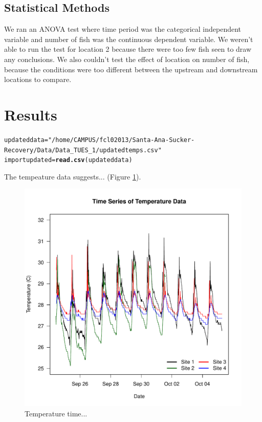 \documentclass{article}\usepackage[]{graphicx}\usepackage[]{color}
\makeatletter
\newcommand{\hlstr}[1]{\textcolor[rgb]{0.192,0.494,0.8}{#1}}%
\newcommand{\hlstd}[1]{\textcolor[rgb]{0.345,0.345,0.345}{#1}}%
\newcommand{\hlkwb}[1]{\textcolor[rgb]{0.69,0.353,0.396}{#1}}%
\newcommand{\hlkwd}[1]{\textcolor[rgb]{0.737,0.353,0.396}{\textbf{#1}}}%
\newenvironment{kframe}{%
 \def\at@end@of@kframe{}%
 \ifinner\ifhmode%
  \def\at@end@of@kframe{\end{minipage}}%
  \begin{minipage}{\columnwidth}%
 \fi\fi%
 \def\FrameCommand##1{\hskip\@totalleftmargin \hskip-\fboxsep
 \colorbox{shadecolor}{##1}\hskip-\fboxsep
     \hskip-\linewidth \hskip-\@totalleftmargin \hskip\columnwidth}%
 \MakeFramed {\advance\hsize-\width
   \@totalleftmargin\z@ \linewidth\hsize
   \@setminipage}}%
 {\par\unskip\endMakeFramed%
 \at@end@of@kframe}
\newenvironment{knitrout}{}{} %
\makeatother
\begin{document}
\subsection{Statistical Methods}

We ran an ANOVA test where time period was the categorical independent variable and number of fish was the continuous dependent variable.  We weren’t able to run the test for location 2 because there were too few fish seen to draw any conclusions.  We also couldn’t test the effect of location on number of fish, because the conditions were too different between the upstream and downstream locations to compare.

\section{Results}

\begin{knitrout}
\color{fgcolor}\begin{kframe}
\begin{alltt}
\hlstd{updateddata}\hlkwb{=} \hlstr{"/home/CAMPUS/fcl02013/Santa-Ana-Sucker-Recovery/Data/Data_TUES_1/updatedtemps.csv"}
\hlstd{importupdated}\hlkwb{=}\hlkwd{read.csv}\hlstd{(updateddata)}
\end{alltt}
\end{kframe}
\end{knitrout}


The tempeature data suggests... (Figure \ref{Temp}).

\begin{figure}
\includegraphics{Figures/Temp}
\caption{Temperature time...}
\label{Temp}
\end{figure}
\end{document}
